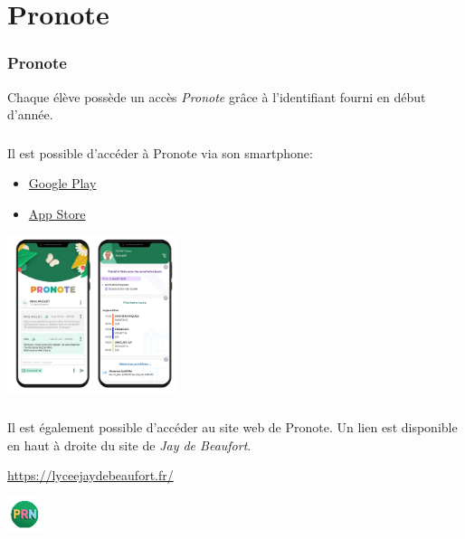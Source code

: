 \documentclass[svgnames,11pt]{beamer}
\begin{document}
\section{Pronote}
\begin{frame}
    \frametitle{Pronote}

Chaque élève possède un accès \emph{Pronote} grâce à l'identifiant fourni en début d'année.

\end{frame}
\begin{frame}
    \frametitle{}

    Il est possible d'accéder à Pronote via son smartphone:
    \begin{itemize}
        \item \href{https://play.google.com/store/apps/details?id=com.IndexEducation.Pronote&hl=fr&gl=US}{Google Play}
        \item \href{https://apps.apple.com/fr/app/pronote/id1138223804}{App Store}
    \end{itemize}
\begin{center}
\centering
\includegraphics[width=5cm]{ressources/screen-pronote-2021.png}
\label{IMG}
\end{center}
\end{frame}
\begin{frame}
    \frametitle{}

Il est également possible d'accéder au site web de Pronote. Un lien est disponible en haut à droite du site de \emph{Jay de Beaufort}.
\begin{center}
    {\Large         \url{https://lyceejaydebeaufort.fr/}
    }
\end{center}
\begin{center}
    \includegraphics[width=1cm]{ressources/pronote.png}
\end{center}
\end{frame}
\end{document}
